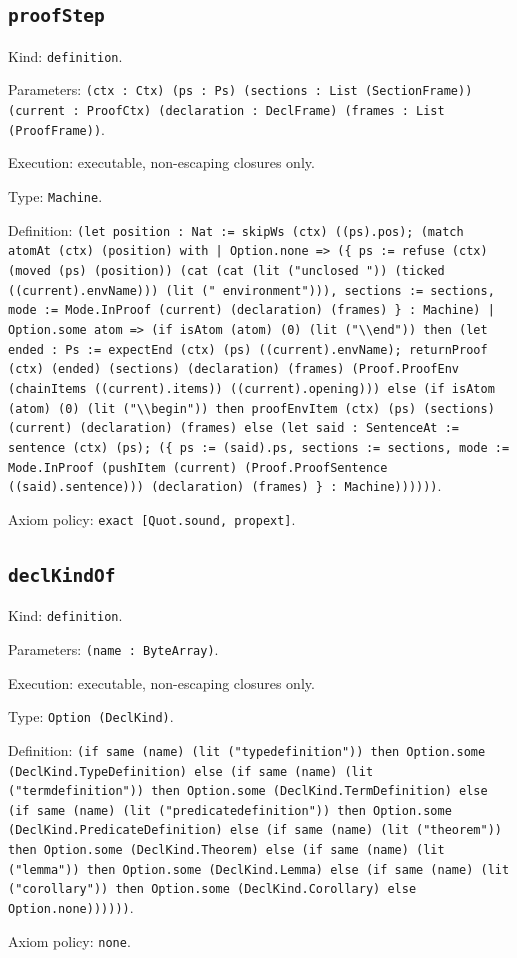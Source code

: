 \documentclass[11pt]{article}
\begin{document}
\subsection*{\texttt{proofStep}}
\noindent Kind: \texttt{definition}.\par
\noindent Parameters: \texttt{(ctx : Ctx) (ps : Ps) (sections : List (SectionFrame)) (current : ProofCtx) (declaration : DeclFrame) (frames : List (ProofFrame))}.\par
\noindent Execution: executable, non-escaping closures only.\par
\noindent Type: \texttt{Machine}.\par
\noindent Definition: \texttt{(let position : Nat := skipWs (ctx) ((ps).pos); (match atomAt (ctx) (position) with | Option.none => (\{ ps := refuse (ctx) (moved (ps) (position)) (cat (cat (lit ("unclosed ")) (ticked ((current).envName))) (lit (" environment"))), sections := sections, mode := Mode.InProof (current) (declaration) (frames) \} : Machine) | Option.some atom => (if isAtom (atom) (0) (lit ("\textbackslash{}\textbackslash{}end")) then (let ended : Ps := expectEnd (ctx) (ps) ((current).envName); returnProof (ctx) (ended) (sections) (declaration) (frames) (Proof.ProofEnv (chainItems ((current).items)) ((current).opening))) else (if isAtom (atom) (0) (lit ("\textbackslash{}\textbackslash{}begin")) then proofEnvItem (ctx) (ps) (sections) (current) (declaration) (frames) else (let said : SentenceAt := sentence (ctx) (ps); (\{ ps := (said).ps, sections := sections, mode := Mode.InProof (pushItem (current) (Proof.ProofSentence ((said).sentence))) (declaration) (frames) \} : Machine))))))}.\par
\noindent Axiom policy: \texttt{exact [Quot.sound, propext]}.\par
\subsection*{\texttt{declKindOf}}
\noindent Kind: \texttt{definition}.\par
\noindent Parameters: \texttt{(name : ByteArray)}.\par
\noindent Execution: executable, non-escaping closures only.\par
\noindent Type: \texttt{Option (DeclKind)}.\par
\noindent Definition: \texttt{(if same (name) (lit ("typedefinition")) then Option.some (DeclKind.TypeDefinition) else (if same (name) (lit ("termdefinition")) then Option.some (DeclKind.TermDefinition) else (if same (name) (lit ("predicatedefinition")) then Option.some (DeclKind.PredicateDefinition) else (if same (name) (lit ("theorem")) then Option.some (DeclKind.Theorem) else (if same (name) (lit ("lemma")) then Option.some (DeclKind.Lemma) else (if same (name) (lit ("corollary")) then Option.some (DeclKind.Corollary) else Option.none))))))}.\par
\noindent Axiom policy: \texttt{none}.\par
\end{document}
